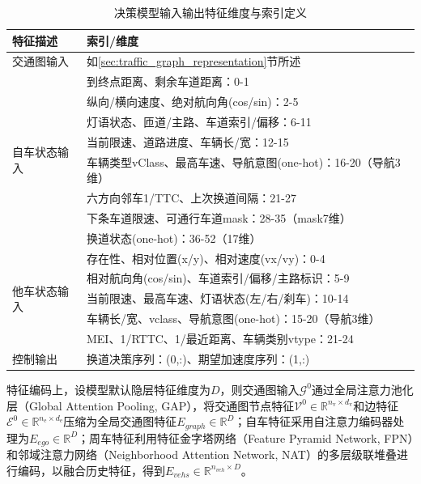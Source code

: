       \begin{table}
        \centering
        \caption{决策模型输入输出特征维度与索引定义}  %
        \begin{tabularx}{\linewidth}{Xl}  %
          \toprule
          特征描述 & 索引/维度 \\  %
          \midrule
          \multirow{1}{*}{交通图输入} & 如\ref{sec:traffic_graph_representation}节所述 \\
          \midrule
          \multirow{8}{*}{自车状态输入} & 到终点距离、剩余车道距离：0-1 \\
          & 纵向/横向速度、绝对航向角(cos/sin)：2-5 \\
          & 灯语状态、匝道/主路、车道索引/偏移：6-11 \\
          & 当前限速、道路进度、车辆长/宽：12-15 \\
          & 车辆类型vClass、最高车速、导航意图(one-hot)：16-20（导航3维） \\
          & 六方向邻车1/TTC、上次换道间隔：21-27 \\
          & 下条车道限速、可通行车道mask：28-35（mask7维） \\
          & 换道状态(one-hot)：36-52（17维） \\
          \midrule  %
          \multirow{5}{*}{他车状态输入} & 存在性、相对位置(x/y)、相对速度(vx/vy)：0-4 \\
          & 相对航向角(cos/sin)、车道索引/偏移/主路标识：5-9 \\
          & 当前限速、最高车速、灯语状态(左/右/刹车)：10-14 \\
          & 车辆长/宽、vclass、导航意图(one-hot)：15-20（导航3维） \\
          & MEI、1/RTTC、1/最近距离、车辆类别vtype：21-24 \\
          \midrule  %
          \multirow{1}{*}{控制输出} & 换道决策序列：(0,:)、期望加速度序列：(1,:)  \\
          \bottomrule
        \end{tabularx}
        \label{tab:vehicle_feature}  %
      \end{table}

      特征编码上，设模型默认隐层特征维度为$D$，则交通图输入$\mathcal{G}^0$通过全局注意力池化层（Global Attention Pooling, GAP），将交通图节点特征$\mathcal{V}^0 \in \mathbb{R}^{n_{\mathrm{v}} \times d_{\mathrm{v}}}$和边特征$\mathcal{E}^0 \in \mathbb{R}^{n_{\mathrm{e}} \times d_{\mathrm{e}}}$压缩为全局交通图特征$E_{graph} \in \mathbb{R}^{D}$；自车特征采用自注意力编码器处理为$E_{ego}\in\mathbb{R}^{D}$；周车特征利用特征金字塔网络（Feature Pyramid Network, FPN）和邻域注意力网络（Neighborhood Attention Network, NAT）的多层级联堆叠\cite{PLUTO2024}进行编码，以融合历史特征，得到$E_{vehs}\in\mathbb{R}^{n_{veh} \times D}$。

